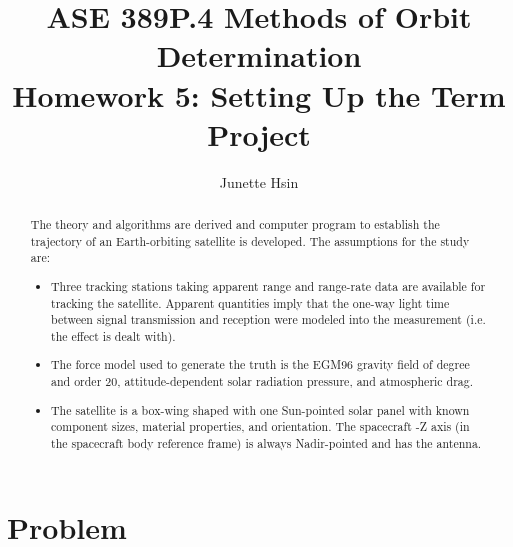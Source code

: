 \documentclass[conf]{new-aiaa}
\title{ASE 389P.4 Methods of Orbit Determination \\ Homework 5: Setting Up the Term Project}
\author{Junette Hsin}
\affil{Masters Student, Aerospace Engineering and Engineering Mechanics, University of Texas, Austin, TX 78712}
\begin{document}
\maketitle

\begin{abstract}
	The theory and algorithms are derived and computer program to establish the trajectory of
	an Earth-orbiting satellite is developed. The assumptions for the study are:
	
	\begin{itemize}
		\item Three tracking stations taking apparent range and range-rate data are available for tracking the	satellite. Apparent quantities imply that the one-way light time between signal transmission and	reception were modeled into the measurement (i.e. the effect is dealt with).
		\item The force model used to generate the truth is the EGM96 gravity field of degree and order 20,
		attitude-dependent solar radiation pressure, and atmospheric drag.
		\item The satellite is a box-wing shaped with one Sun-pointed solar panel with known component sizes, material properties, and orientation. The spacecraft -Z axis (in the spacecraft body reference frame) is always Nadir-pointed and has the antenna.
	\end{itemize}
	

\end{abstract}


\section*{Problem}

\begin{center}
 \\
\end{center}
\end{document}
